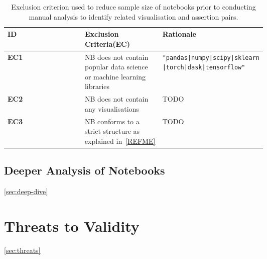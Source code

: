\documentclass[acmsmall,screen,review,anonymous]{acmart}
\begin{document}
\begin{table}
  \centering
  \caption{Exclusion criterion used to reduce sample size of notebooks
    prior to conducting manual analysis to identify related
    visualisation and assertion pairs.}
  \begin{tabular}{l p{0.3\linewidth} p{0.3\linewidth}}
    \toprule
    \textbf{ID} &
    \textbf{Exclusion Criteria(EC)} &
    \textbf{Rationale}\\
    \midrule
    \textbf{EC1} &
    NB does not contain popular data science or machine
    learning libraries &
    \texttt{"pandas|numpy|scipy|sklearn |torch|dask|tensorflow"}\\
    \textbf{EC2} &
    NB does not contain any visualisations &
    TODO\\
    \textbf{EC3} &
    NB conforms to a strict structure as explained in~\ref{REFME} &
    TODO\\
    \bottomrule
  \end{tabular}
  \label{tab:pre-exclusion-criteria}
\end{table}
\subsection{Deeper Analysis of Notebooks}\ref{sec:deep-dive}
\section{Threats to Validity}\ref{sec:threats}

\end{document}
